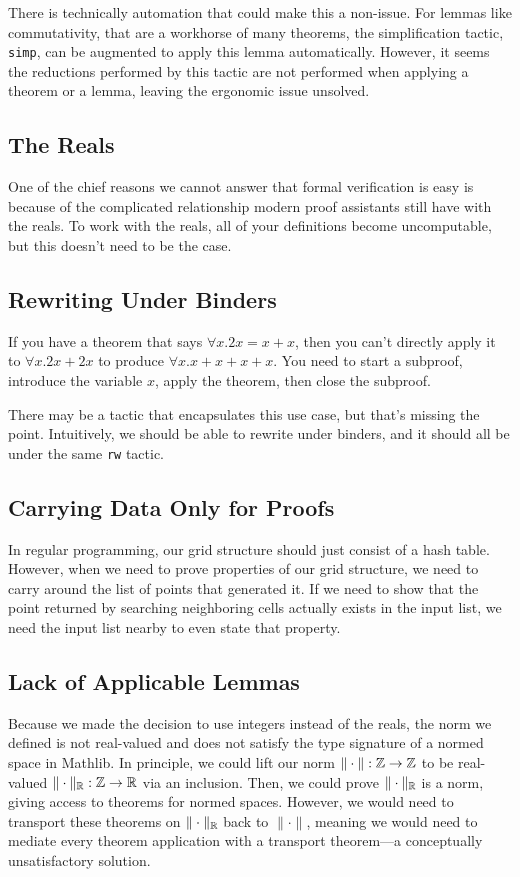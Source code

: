 \documentclass{article}
\begin{document}
There is technically automation that could make this a non-issue.
For lemmas like commutativity, that are a workhorse of many theorems, the simplification tactic, \texttt{simp}, can be augmented to apply this lemma automatically.
However, it seems the reductions performed by this tactic are not performed when applying a theorem or a lemma, leaving the ergonomic issue unsolved.



\subsection{The Reals}
One of the chief reasons we cannot answer that formal verification is easy is because of the complicated relationship modern proof assistants still have with the reals.
To work with the reals, all of your definitions become uncomputable, but this doesn't need to be the case.

\subsection{Rewriting Under Binders}
If you have a theorem that says $\forall x. 2x = x + x$, then you can't directly apply it to $\forall x. 2x + 2x$ to produce $\forall x. x + x + x + x$.
You need to start a subproof, introduce the variable $x$, apply the theorem, then close the subproof.

There may be a tactic that encapsulates this use case, but that's missing the point.
Intuitively, we should be able to rewrite under binders, and it should all be under the same \texttt{rw} tactic.

\subsection{Carrying Data Only for Proofs}
In regular programming, our grid structure should just consist of a hash table.
However, when we need to prove properties of our grid structure, we need to carry around the list of points that generated it.
If we need to show that the point returned by searching neighboring cells actually exists in the input list, we need the input list nearby to even state that property.

\subsection{Lack of Applicable Lemmas}
Because we made the decision to use integers instead of the reals, the norm we defined is not real-valued and does not satisfy the type signature of a normed space in Mathlib.  
In principle, we could lift our norm $\| \cdot \| : \mathbb{Z} \to \mathbb{Z}$ to be real-valued $\| \cdot \|_{\mathbb{R}} : \mathbb{Z} \to \mathbb{R}$ via an inclusion.
Then, we could prove $\| \cdot \|_{\mathbb{R}}$ is a norm, giving access to theorems for normed spaces.
However, we would need to transport these theorems on $\| \cdot \|_{\mathbb{R}}$ back to $\| \cdot \|$, meaning we would need to mediate every theorem application with a transport theorem---a conceptually unsatisfactory solution.
\end{document}
